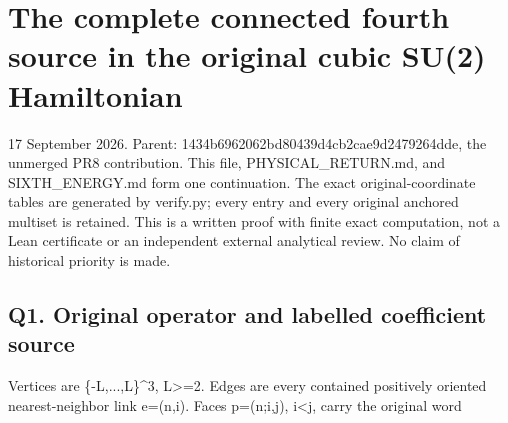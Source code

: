\documentclass[11pt,a4paper]{article}
\let\originalsection\section
\renewcommand{\section}{\clearpage\originalsection}
\renewcommand{\[}{\begingroup\small\originaldisplaystart}
\renewcommand{\]}{\originaldisplayend\endgroup}
\begin{document}
\clearpage
\appendix

\section{The complete connected fourth source in the original cubic
SU(2)
Hamiltonian}\label{the-complete-connected-fourth-source-in-the-original-cubic-su2-hamiltonian}

17 September 2026. Parent:
{\allowbreak{}1\allowbreak{}4\allowbreak{}3\allowbreak{}4\allowbreak{}b\allowbreak{}6\allowbreak{}9\allowbreak{}6\allowbreak{}2\allowbreak{}0\allowbreak{}6\allowbreak{}2\allowbreak{}b\allowbreak{}d\allowbreak{}8\allowbreak{}0\allowbreak{}4\allowbreak{}3\allowbreak{}9\allowbreak{}d\allowbreak{}4\allowbreak{}c\allowbreak{}b\allowbreak{}2\allowbreak{}c\allowbreak{}a\allowbreak{}e\allowbreak{}9\allowbreak{}d\allowbreak{}2\allowbreak{}4\allowbreak{}7\allowbreak{}9\allowbreak{}2\allowbreak{}6\allowbreak{}4\allowbreak{}d\allowbreak{}d\allowbreak{}e\allowbreak{}},
the unmerged PR8 contribution. This file,
{\ttfamily P\allowbreak{}H\allowbreak{}Y\allowbreak{}S\allowbreak{}I\allowbreak{}C\allowbreak{}A\allowbreak{}L\allowbreak{}\_\allowbreak{}R\allowbreak{}E\allowbreak{}T\allowbreak{}U\allowbreak{}R\allowbreak{}N\allowbreak{}.\allowbreak{}m\allowbreak{}d\allowbreak{}},
and
{\ttfamily S\allowbreak{}I\allowbreak{}X\allowbreak{}T\allowbreak{}H\allowbreak{}\_\allowbreak{}E\allowbreak{}N\allowbreak{}E\allowbreak{}R\allowbreak{}G\allowbreak{}Y\allowbreak{}.\allowbreak{}m\allowbreak{}d\allowbreak{}}
form one continuation. The exact original-coordinate tables are
generated by
{\ttfamily v\allowbreak{}e\allowbreak{}r\allowbreak{}i\allowbreak{}f\allowbreak{}y\allowbreak{}.\allowbreak{}p\allowbreak{}y\allowbreak{}};
every entry and every original anchored multiset is retained. This is a
written proof with finite exact computation, not a Lean certificate or
an independent external analytical review. No claim of historical
priority is made.

\subsection{Q1. Original operator and labelled coefficient
source}\label{q1.-original-operator-and-labelled-coefficient-source}

Vertices are
{\ttfamily \{\allowbreak{}-\allowbreak{}L\allowbreak{},\allowbreak{}.\allowbreak{}.\allowbreak{}.\allowbreak{},\allowbreak{}L\allowbreak{}\}\allowbreak{}\textasciicircum{}\allowbreak{}3\allowbreak{}},
L\textgreater=2. Edges are every contained positively oriented
nearest-neighbor link e=(n,i). Faces p=(n;i,j), i\textless j, carry the
original word
\end{document}
